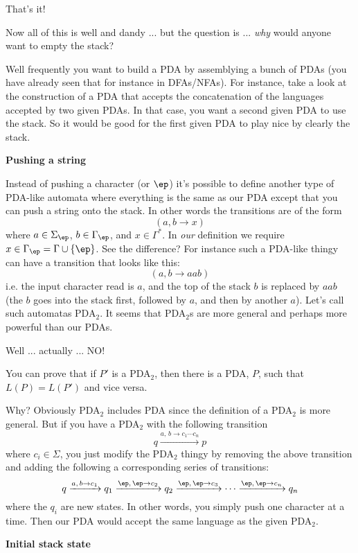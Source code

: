 That's it!

Now all of this is well and dandy ... but the question is ... 
\textit{ why} would anyone want to empty the stack?

Well frequently you want to build a PDA by assemblying a bunch of PDAs
(you have already seen that for instance in DFAs/NFAs).
For instance, take a look at the construction of a PDA that accepts
the concatenation of the languages accepted by two given PDAs.
In that case, you want a second given PDA to use the stack.
So it would be good for the first given PDA to play nice by clearly
the stack.

\textbf{Pushing a string}

Instead of pushing a character (or $\ep$) it's possible to define another 
type of PDA-like automata where everything is the same as our PDA except that 
you can 
push a string onto the stack.
In other words the transitions are of the form
\[
(a, b \rightarrow x)
\]
where $a \in \Sigma_\ep$, $b \in \Gamma_\ep$, and $x \in \Gamma^*$.
In \textit{ our} definition we require $x \in \Gamma_\ep = \Gamma \cup \{\ep\}$.
See the difference?
For instance such a PDA-like thingy can have a transition that looks like
this:
\[
(a, b \rightarrow aab)
\]
i.e. the input character read is $a$, and the top of the stack $b$ is
replaced by $aab$ (the $b$ goes into the stack first, followed by 
$a$, and then by another $a$).
Let's call such automatas PDA$_2$.
It seems that PDA$_2$s are more general and perhaps more powerful than our 
PDAs.

Well ... actually ... NO!

You can prove that if $P'$ is a PDA$_2$, then there is a PDA, $P$, such that
$L(P) = L(P')$ and vice versa.

Why? 
Obviously PDA$_2$ includes PDA since the definition of a PDA$_2$ is more
general.
But if you have a PDA$_2$ with the following transition
\[
q \xrightarrow{a, \, b \rightarrow c_1 \cdots c_n} p 
\]
where $c_i \in \Sigma$, you just modify the PDA$_2$ 
thingy by removing the above transition and adding the
following a corresponding 
series of transitions:
\[
q 
\xrightarrow{a, \, b \rightarrow c_1} q_1 
\xrightarrow{\ep, \, \ep \rightarrow c_2} q_2
\xrightarrow{\ep, \, \ep \rightarrow c_3}
\cdots  
\xrightarrow{\ep, \, \ep \rightarrow c_n} q_n 
\]
where the $q_i$ are new states.
In other words, you simply push one character at a time.
Then our PDA would accept the same language as the given PDA$_2$.




\textbf{Initial stack state}

